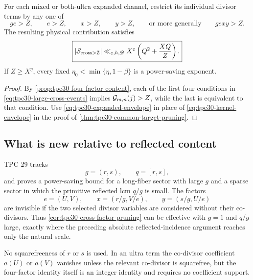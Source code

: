 \begin{corollary}
\label{cor:tpc30-cross-factor-pruning}
For each mixed or both-ultra expanded channel, restrict its individual
divisor terms by any one of
\begin{equation}
 ge>Z,\qquad e>Z,\qquad x>Z,\qquad y>Z,
 \qquad\text{or more generally}\qquad gexy>Z.
 \label{eq:tpc30-large-cross-events}
\end{equation}
The resulting physical contribution satisfies
\begin{equation}
 \boxed{
 |\mathcal S_{\rm cross>Z}|
 \ll_{\varepsilon,h,\mathscr D}X^\varepsilon
 \left(Q^2+\frac{XQ}{Z}\right).}
 \label{eq:tpc30-cross-factor-bound}
\end{equation}
If $Z\ge X^\eta$, every fixed
$\eta_0<\min\{\eta,1-\beta\}$ is a power-saving exponent.
\end{corollary}

\begin{proof}
By \cref{prop:tpc30-four-factor-content}, each of the first four
conditions in \eqref{eq:tpc30-large-cross-events} implies
$\mathcal G_{m,n}(j)>Z$, while the last is equivalent to that condition.
Use \eqref{eq:tpc30-expanded-envelope} in place of
\eqref{eq:tpc30-kernel-envelope} in the proof of
\cref{thm:tpc30-common-target-pruning}.
\end{proof}

\subsection{What is new relative to reflected content}

TPC-29 tracks
\[
 g=(r,s),\qquad q=[r,s],
\]
and proves a power-saving bound for a long-fiber sector with large $g$
and a sparse sector in
which the primitive reflected lcm $q/g$ is small.  The factors
\[
 e=(U,V),\qquad
 x=(r/g,V/e),\qquad
 y=(s/g,U/e)
\]
are invisible if the two selected divisor variables are considered
without their co-divisors.  Thus
\cref{cor:tpc30-cross-factor-pruning} can be effective with $g=1$ and
$q/g$ large, exactly where the preceding absolute reflected-incidence
argument reaches only the natural scale.

No squarefreeness of $r$ or $s$ is used.  In an ultra term the
co-divisor coefficient $a(U)$ or $a(V)$ vanishes unless the relevant
co-divisor is squarefree, but the four-factor identity itself is an
integer identity and requires no coefficient support.
